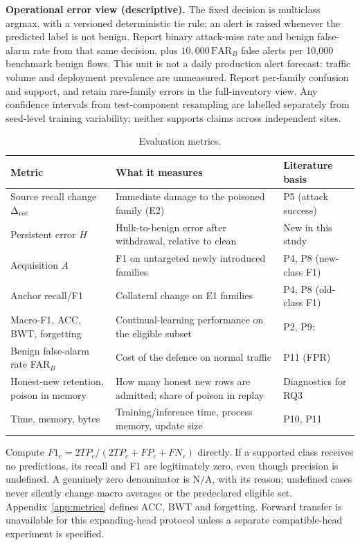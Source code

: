 \documentclass[10pt,a4paper]{article}
\newcommand{\NA}{\mathrm{N/A}}
\begin{document}
\textbf{Operational error view (descriptive).} The fixed decision is multiclass argmax, with a versioned deterministic tie rule; an alert is raised whenever the predicted label is not benign. Report binary attack-miss rate and benign false-alarm rate from that same decision, plus $10,000\,\mathrm{FAR}_B$ false alerts per 10,000 benchmark benign flows. This unit is not a daily production alert forecast: traffic volume and deployment prevalence are unmeasured. Report per-family confusion and support, and retain rare-family errors in the full-inventory view. Any confidence intervals from test-component resampling are labelled separately from seed-level training variability; neither supports claims across independent sites.

\begin{table}[H]
\centering\footnotesize
\caption{Evaluation metrics.}
\label{tab:metrics}
\begin{tabularx}{\linewidth}{L{3.6cm}Y L{3.0cm}}
\toprule
Metric & What it measures & Literature basis\\
\midrule
Source recall change $\Delta_{\rm rec}$ & Immediate damage to the poisoned family (E2) & P5 (attack success)\\
Persistent error $H$ & Hulk-to-benign error after withdrawal, relative to clean & New in this study\\
Acquisition $A$ & F1 on untargeted newly introduced families & P4, P8 (new-class F1)\\
Anchor recall/F1 & Collateral change on E1 families & P4, P8 (old-class F1)\\
Macro-F1, ACC, BWT, forgetting & Continual-learning performance on the eligible subset & P2, P9; \cite{gem,clmetrics}\\
Benign false-alarm rate FAR$_B$ & Cost of the defence on normal traffic & P11 (FPR)\\
Honest-new retention, poison in memory & How many honest new rows are admitted; share of poison in replay & Diagnostics for RQ3\\
Time, memory, bytes & Training/inference time, process memory, update size & P10, P11\\
\bottomrule
\end{tabularx}
\end{table}
Compute $F1_c=2TP_c/(2TP_c+FP_c+FN_c)$ directly. If a supported class receives no predictions, its recall and F1 are legitimately zero, even though precision is undefined. A genuinely zero denominator is $\NA$, with its reason; undefined cases never silently change macro averages or the predeclared eligible set. Appendix~\ref{app:metrics} defines ACC, BWT and forgetting. Forward transfer is unavailable for this expanding-head protocol unless a separate compatible-head experiment is specified.
\end{document}
